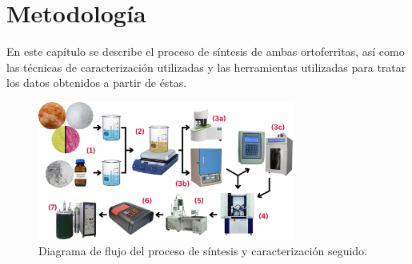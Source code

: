 \documentclass[../main.tex]{subfiles}
\begin{document}
\chapter{Metodología}
En este capítulo se describe el proceso de síntesis de ambas ortoferritas, así como las técnicas de caracterización utilizadas y las herramientas utilizadas para tratar los datos obtenidos a partir de éstas.
\begin{figure}[H]
    \centering
    \includegraphics[width=0.75\textwidth]{fig/2.png}
    \caption{Diagrama de flujo del proceso de síntesis y caracterización seguido.}
    \label{fig:diagflujosint}
\end{figure}
\end{document}
